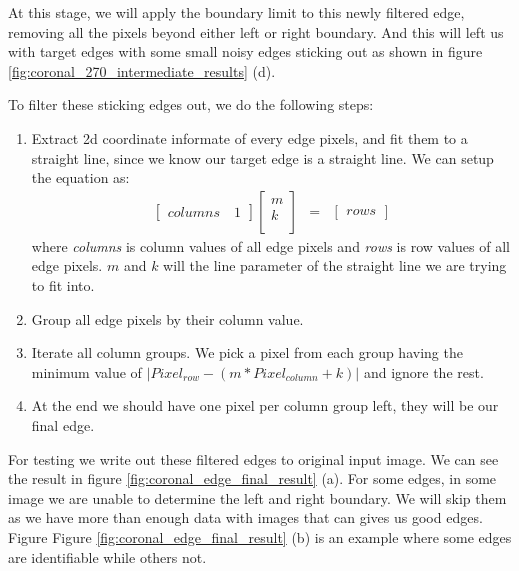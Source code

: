 At this stage, we will apply the boundary limit to this newly filtered edge, removing all the pixels beyond
either left or right boundary. And this will left us with target edges with some small noisy edges sticking
out as shown in figure \ref{fig:coronal_270_intermediate_results} (d).

To filter these sticking edges out, we do the following steps:

\begin{enumerate}
  \item Extract 2d coordinate informate of every edge pixels, and fit them to a straight line, since we know
    our target edge is a straight line. We can setup the equation as:
    \begin{eqnarray}
      \begin{bmatrix}
        columns \quad 1
      \end{bmatrix}
      \begin{bmatrix}
        m\\
        k\\
      \end{bmatrix}
      & = & 
      \begin{bmatrix}
        rows
      \end{bmatrix}
    \end{eqnarray}
    where \emph{columns} is column values of all edge pixels and \emph{rows} is row values of all edge pixels.
    $m$ and $k$ will the line parameter of the straight line we are trying to fit into.
  \item Group all edge pixels by their column value.
  \item Iterate all column groups. We pick a pixel from each group having the minimum value of
    $|Pixel_{row} - (m*Pixel_{column} + k)|$ and ignore the rest.
  \item At the end we should have one pixel per column group left, they will be our final edge.
\end{enumerate}

For testing we write out these filtered edges to original input image. We can see the result in figure 
\ref{fig:coronal_edge_final_result} (a). For some edges, in some image we are unable to determine the left
and right boundary. We will skip them as we have more than enough data with images that can gives us good 
edges. Figure Figure \ref{fig:coronal_edge_final_result} (b) is an example where some edges are identifiable
while others not.

